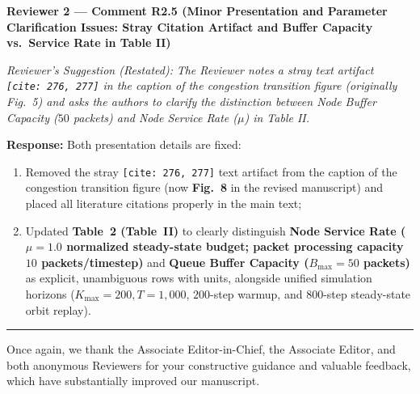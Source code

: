 \documentclass[11pt,a4paper]{article}
\newcommand{\cbox}[2]{%
  \vspace{0.6em}\noindent\textbf{#1}\par\smallskip
  \noindent\textit{Reviewer's Suggestion (Restated):} \textit{#2}\par\smallskip
}
\begin{document}
\hrulefill

\cbox{Reviewer 2 --- Comment R2.5 (Minor Presentation and Parameter Clarification Issues: Stray Citation Artifact and Buffer Capacity vs.\ Service Rate in Table II)}{The Reviewer notes a stray text artifact \texttt{[cite:\ 276, 277]} in the caption of the congestion transition figure (originally Fig.~5) and asks the authors to clarify the distinction between Node Buffer Capacity ($50$ packets) and Node Service Rate ($\mu$) in Table II.}

\noindent\textbf{Response:} Both presentation details are fixed:
\begin{enumerate}[leftmargin=1.8em]
    \item Removed the stray \texttt{[cite:\ 276, 277]} text artifact from the caption of the congestion transition figure (now \textbf{Fig.~8} in the revised manuscript) and placed all literature citations properly in the main text;
    \item Updated \textbf{Table~2 (Table~II)} to clearly distinguish \textbf{Node Service Rate ($\mu = 1.0$ normalized steady-state budget; packet processing capacity $10$ packets/timestep)} and \textbf{Queue Buffer Capacity ($B_{\max} = 50$ packets)} as explicit, unambiguous rows with units, alongside unified simulation horizons ($K_{\max}=200, T=1{,}000$, $200$-step warmup, and $800$-step steady-state orbit replay).
\end{enumerate}

\vspace{1em}
\hrule
\vspace{0.5em}
Once again, we thank the Associate Editor-in-Chief, the Associate Editor, and both anonymous Reviewers for your constructive guidance and valuable feedback, which have substantially improved our manuscript.
\end{document}
